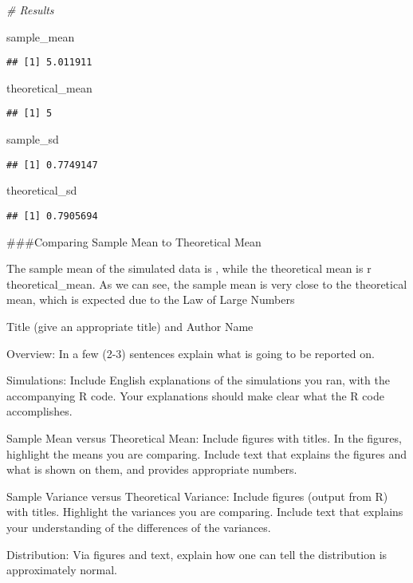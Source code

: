 \documentclass[
]{article}
\newenvironment{Shaded}{\begin{snugshade}}{\end{snugshade}}
\newcommand{\CommentTok}[1]{\textcolor[rgb]{0.56,0.35,0.01}{\textit{#1}}}
\newcommand{\NormalTok}[1]{#1}
\begin{document}
\begin{Shaded}
\begin{Highlighting}[]
\CommentTok{\# Results}

\NormalTok{sample\_mean}
\end{Highlighting}
\end{Shaded}

\begin{verbatim}
## [1] 5.011911
\end{verbatim}

\begin{Shaded}
\begin{Highlighting}[]
\NormalTok{theoretical\_mean}
\end{Highlighting}
\end{Shaded}

\begin{verbatim}
## [1] 5
\end{verbatim}

\begin{Shaded}
\begin{Highlighting}[]
\NormalTok{sample\_sd}
\end{Highlighting}
\end{Shaded}

\begin{verbatim}
## [1] 0.7749147
\end{verbatim}

\begin{Shaded}
\begin{Highlighting}[]
\NormalTok{theoretical\_sd}
\end{Highlighting}
\end{Shaded}

\begin{verbatim}
## [1] 0.7905694
\end{verbatim}

\#\#\#Comparing Sample Mean to Theoretical Mean

The sample mean of the simulated data is , while the theoretical mean is
r theoretical\_mean. As we can see, the sample mean is very close to the
theoretical mean, which is expected due to the Law of Large Numbers

Title (give an appropriate title) and Author Name

Overview: In a few (2-3) sentences explain what is going to be reported
on.

Simulations: Include English explanations of the simulations you ran,
with the accompanying R code. Your explanations should make clear what
the R code accomplishes.

Sample Mean versus Theoretical Mean: Include figures with titles. In the
figures, highlight the means you are comparing. Include text that
explains the figures and what is shown on them, and provides appropriate
numbers.

Sample Variance versus Theoretical Variance: Include figures (output
from R) with titles. Highlight the variances you are comparing. Include
text that explains your understanding of the differences of the
variances.

Distribution: Via figures and text, explain how one can tell the
distribution is approximately normal.
\end{document}
